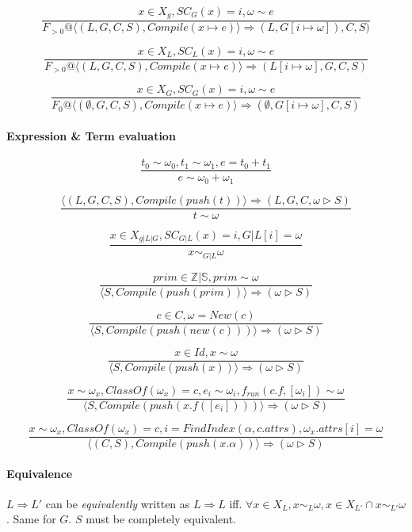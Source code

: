 \documentclass[]{article}
\numberwithin{equation}{section}
\numberwithin{figure}{section}
\numberwithin{table}{section}
\begin{document}
\[\frac{x \in X_g, SC_G(x) = i, \omega \sim e}
        {F_{>0}@\langle (L, G, C, S), Compile (x \mapsto e) \rangle \Rightarrow (L, G[i \mapsto \omega]), C, S)}\]

\[\frac{x \in X_L, SC_L(x) = i, \omega \sim e}
        {F_{>0}@\langle (L, G, C, S), Compile (x \mapsto e) \rangle \Rightarrow (L[i \mapsto \omega], G, C, S)}\]

\[\frac{x \in X_G, SC_G(x) = i, \omega \sim e}
        {F_0@\langle (\emptyset, G, C, S), Compile (x \mapsto e) \rangle \Rightarrow (\emptyset, G[i \mapsto \omega], C, S)}\]

\paragraph{Expression \& Term
evaluation}\label{expression-term-evaluation}

\[\frac{t_0 \sim \omega_0, t_1 \sim \omega_1, e = t_0 + t_1}
        {e \sim \omega_0 + \omega_1}\]

\[\frac{\langle(L, G, C, S), Compile(push(t)) \rangle \Rightarrow (L, G, C, \omega \rhd S)}
        {t \sim \omega}\]

\[\frac{x \in X_{g|L|G}, SC_{G|L}(x) = i, G|L[i] = \omega}{x \sim_{G|L} \omega}\]

\[\frac{prim \in \mathbb{Z|S}, prim \sim \omega}
        {\langle S, Compile(push(prim)) \rangle \Rightarrow (\omega \rhd S)}\]

\[\frac{c \in C, \omega = New(c)}
        {\langle S, Compile(push(new(c))) \rangle \Rightarrow (\omega \rhd S)}\]

\[\frac{x \in Id, x \sim \omega}
        {\langle S, Compile(push(x)) \rangle \Rightarrow (\omega \rhd S)}\]

\[\frac{x \sim \omega_x, ClassOf(\omega_x) = c,  e_i \sim \omega_i, f_{run}(c.f, [\omega_i]) \sim \omega}
        {\langle S, Compile(push(x.f([e_i]))) \rangle \Rightarrow (\omega \rhd S)}\]

\[\frac{x \sim \omega_x, ClassOf(\omega_x) = c, i = FindIndex(\alpha, c.attrs), \omega_x.attrs[i] = \omega }
        {\langle (C, S), Compile(push(x.\alpha)) \rangle \Rightarrow (\omega \rhd S)}\]

\paragraph{Equivalence}\label{equivalence}

$L \Rightarrow L'$ can be \emph{equivalently} written as
$L \Rightarrow L$ iff.
$\forall x \in X_{L}, x \sim_L \omega, x \in X_{L'} \cap x \sim_{L'} \omega$.
Same for $G$. $S$ must be completely equivalent.
\end{document}
